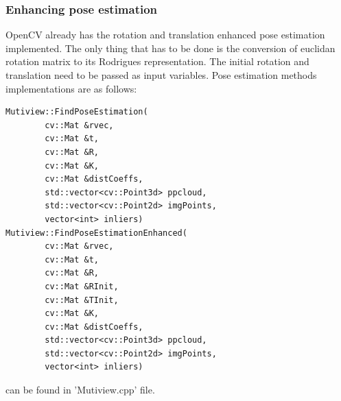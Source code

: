 \subsubsection{Enhancing pose estimation}
OpenCV already has the rotation and translation enhanced pose estimation implemented. The only thing that has to be done is the conversion of euclidan rotation matrix to its Rodrigues representation. The initial rotation and translation need to be passed as input variables. Pose estimation methods implementations are as follows: 
\begin{lstlisting}
Mutiview::FindPoseEstimation(
        cv::Mat &rvec,
        cv::Mat &t,
        cv::Mat &R,
        cv::Mat &K,
        cv::Mat &distCoeffs,
        std::vector<cv::Point3d> ppcloud,
        std::vector<cv::Point2d> imgPoints,
        vector<int> inliers) 
Mutiview::FindPoseEstimationEnhanced(
        cv::Mat &rvec,
        cv::Mat &t,
        cv::Mat &R,
        cv::Mat &RInit,
        cv::Mat &TInit,
        cv::Mat &K,
        cv::Mat &distCoeffs,
        std::vector<cv::Point3d> ppcloud,
        std::vector<cv::Point2d> imgPoints,
        vector<int> inliers)
\end{lstlisting}
can be found in 'Mutiview.cpp' file.



